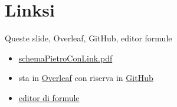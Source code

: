 \documentclass[9pt]{beamer}
\begin{document}
\section{Linksi}

\begin{frame}{Queste slide, Overleaf, GitHub, editor formule}

\begin{itemize}

\item
\href{https://terna.to.it/ejmmp/deposito/schemaPietroConLink.pdf}{schemaPietroConLink.pdf}

\item
sta in \href{https://it.overleaf.com/6892135118fggbxjhrmxdg}{Overleaf} con riserva in \href{https://github.com/terna/ejmmpSchemaPietro}{GitHub}

\item
\href{https://editor.codecogs.com}{editor di formule}

\end{itemize}


\end{frame}
\end{document}
